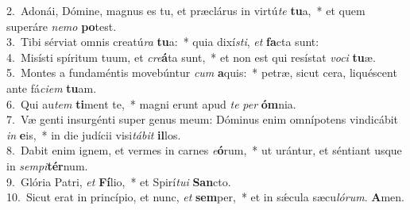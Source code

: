 {2.~}Adonái, Dómine, magnus es tu, et præclárus in virtú\textit{te} \textbf{tu}a,~* et quem superáre \textit{ne}\textit{mo} \textbf{po}test.\\
{3.~}Tibi sérviat omnis creatú\textit{ra} \textbf{tu}a:~* quia dixí\textit{sti}, \textit{et} \textbf{fa}cta sunt:\\
{4.~}Misísti spíritum tuum, et \textit{cre}\textbf{á}ta sunt,~* et non est qui resístat \textit{vo}\textit{ci} \textbf{tu}æ.\\
{5.~}Montes a fundaméntis movebúntur \textit{cum} \textbf{a}quis:~* petræ, sicut cera, liquéscent ante fá\textit{ci}\textit{em} \textbf{tu}am.\\
{6.~}Qui au\textit{tem} \textbf{ti}ment te,~* magni erunt apud \textit{te} \textit{per} \textbf{óm}nia.\\
{7.~}Væ genti insurgénti super genus meum: Dóminus enim omnípotens vindicábit \textit{in} \textbf{e}is,~* in die judícii visi\textit{tá}\textit{bit} \textbf{il}los.\\
{8.~}Dabit enim ignem, et vermes in carnes \textit{e}\textbf{ó}rum,~* ut urántur, et séntiant usque in \textit{sem}\textit{pi}\textbf{tér}num.\\
{9.~}Glória Patri, \textit{et} \textbf{Fí}lio,~* et Spirí\textit{tu}\textit{i} \textbf{San}cto.\\
{10.~}Sicut erat in princípio, et nunc, \textit{et} \textbf{sem}per,~* et in sǽcula sæcu\textit{ló}\textit{rum}. \textbf{A}men.\\
